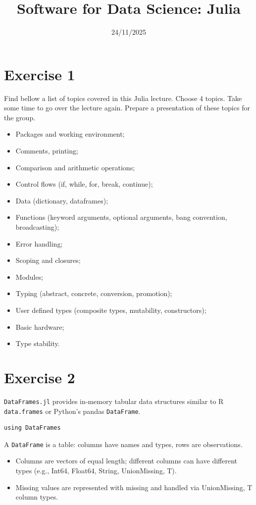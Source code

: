 \documentclass{article}
\title{Software for Data Science: Julia}
\date{24/11/2025}
\begin{document}
\maketitle
\section*{Exercise 1}

\medskip
\noindent
Find bellow a list of topics covered in this Julia lecture. Choose 4 topics. Take some time to go over the lecture again. Prepare a presentation of these topics for the group.

\begin{itemize}
    \item Packages and working environment;
    \item Comments, printing;
    \item Comparison and arithmetic operations;
    \item Control flows (if, while, for, break, continue);
    \item Data (dictionary, dataframes);
    \item Functions (keyword arguments, optional arguments, bang convention, broadcasting);
    \item Error handling;
    \item Scoping and closures;
    \item Modules;
    \item Typing (abstract, concrete, conversion, promotion);
    \item User defined types (composite types, mutability, constructors);
    \item Basic hardware;
    \item Type stability.
\end{itemize}

\section*{Exercise 2}

\medskip
\noindent
\texttt{DataFrames.jl} provides in‑memory tabular data structures similar to R \texttt{data.frames} or Python’s pandas \texttt{DataFrame}.

\begin{verbatim}
using DataFrames
\end{verbatim}

\medskip
\noindent
A \texttt{DataFrame} is a table: columns have names and types, rows are observations.
\begin{itemize}
    \item Columns are vectors of equal length; different columns can have different types (e.g., Int64, Float64, String, Union{Missing, T}).
    \item Missing values are represented with missing and handled via Union{Missing, T} column types.
\end{itemize}
\end{document}
